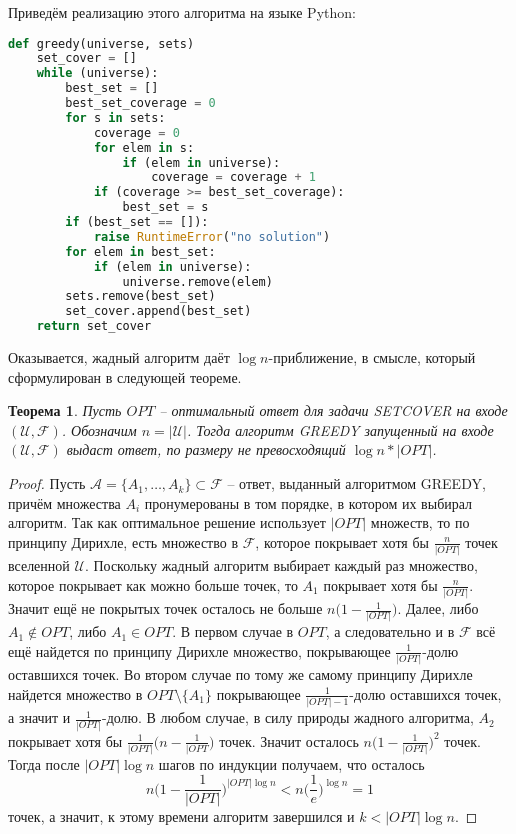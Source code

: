 \documentclass{article}
\newtheorem{theorem}{Теорема}
\begin{document}
Приведём реализацию этого алгоритма на языке \textsf{Python}:
\begin{lstlisting}[language=python]
def greedy(universe, sets)
    set_cover = []
    while (universe):
        best_set = []
        best_set_coverage = 0
        for s in sets:
            coverage = 0
            for elem in s:
                if (elem in universe):
                    coverage = coverage + 1
            if (coverage >= best_set_coverage):
                best_set = s
        if (best_set == []):
            raise RuntimeError("no solution")
        for elem in best_set:
            if (elem in universe):
                universe.remove(elem)
        sets.remove(best_set)
        set_cover.append(best_set)
    return set_cover

\end{lstlisting}
Оказывается, жадный алгоритм даёт $\log n$-приближение, в смысле, который сформулирован в следующей теореме.

\begin{theorem}
Пусть $OPT$ -- оптимальный ответ для задачи \textsf{SETCOVER} на входе $(\mathcal{U}, \mathcal{F})$. Обозначим $n = |\mathcal{U}|$. Тогда
алгоритм GREEDY запущенный на входе $(\mathcal{U}, \mathcal{F})$ выдаст ответ, по размеру не превосходящий $\log n * |OPT|$.
\end{theorem}

\begin{proof}
Пусть $\mathcal{A} = \{A_1, \ldots, A_k\} \subset \mathcal{F}$ -- ответ, выданный алгоритмом GREEDY, причём множества $A_i$ пронумерованы в том порядке, в котором их выбирал алгоритм. Так как оптимальное решение использует $|OPT|$ множеств, то по принципу Дирихле, есть множество в $\mathcal{F}$, которое покрывает хотя бы $\frac{n}{|OPT|}$ точек вселенной $\mathcal{U}$. Поскольку жадный алгоритм выбирает каждый раз множество, которое покрывает как можно больше точек, то $A_1$ покрывает хотя бы $\frac{n}{|OPT|}$. Значит ещё не покрытых точек осталось не больше $n \Big(1 - \frac{1}{|OPT|}\Big)$. Далее, либо $A_1 \notin OPT$, либо $A_1 \in OPT$. В первом случае в $OPT$, а следовательно и в $\mathcal{F}$ всё ещё найдется по принципу Дирихле множество, покрывающее $\frac{1}{|OPT|}$-долю оставшихся точек. Во втором случае по тому же самому принципу Дирихле найдется множество в $OPT \setminus \{A_1\}$ покрывающее $\frac{1}{|OPT| - 1}$-долю оставшихся точек, а значит и $\frac{1}{|OPT|}$-долю. В любом случае, в силу природы жадного алгоритма, $A_2$ покрывает хотя бы $\frac{1}{|OPT|}\Big(n - \frac{1}{|OPT}\Big)$ точек. Значит осталось $n \Big(1 - \frac{1}{|OPT|} \Big)^2$ точек. Тогда после $|OPT| \log n$ шагов по индукции получаем, что осталось 
$$n \Big(1 - \frac{1}{|OPT|}\Big)^{|OPT| \log n} < n \Big(\frac{1}{e}\Big)^{\log n} = 1$$ точек, а значит, к этому времени алгоритм завершился и $k < |OPT| \log n$.
\end{proof}
\end{document}
